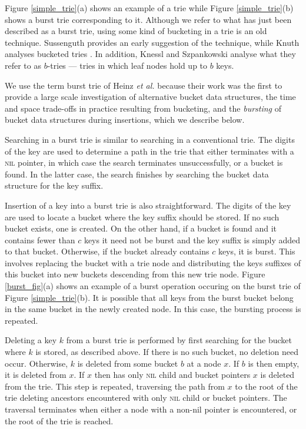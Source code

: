 \documentclass[]{acmtrans2m}
\begin{document}
Figure \ref{simple_trie}(a) shows an example of a trie while Figure \ref{simple_trie}(b)
shows a burst trie corresponding to it. Although we refer to what has just been described as a burst trie, using some kind of bucketing
in a trie is an old technique. Sussenguth \citeyear{Sussenguth63} provides an early suggestion of the technique, 
while Knuth analyses bucketed tries \citeyear{Knuth98}. In addition, Knessl and Szpankowski \citeyear{KnesslSzpankowski00a,KnesslSzpankowski00b} 
analyse what they refer to as $b$-tries --- tries in which leaf nodes hold up to $b$ keys. 

We use the term burst trie of Heinz \textit{et al.} \citeyear{Heinz+02} because their work was the first to
provide a large scale investigation of alternative bucket data structures, the time and space trade-offs
in practice resulting from bucketing, and the \textit{bursting} of bucket data structures during insertions,
which we describe below.

Searching in a burst trie is similar to searching in a conventional trie.
The digits of the key are used to determine a path in the trie that either terminates
with a \textsc{nil} pointer, in which case the search terminates unsuccessfully, or a bucket is found.
In the latter case, the search finishes by searching the bucket data structure for the key
suffix.

Insertion of a key into a burst trie is also straightforward. The digits of the key are used to locate
a bucket where the key suffix should be stored. If no such bucket exists, one is created. On the other
hand, if a bucket is found and it contains fewer than $c$ keys it need not be burst and the key suffix
is simply added to that bucket. Otherwise, if the bucket already contains $c$ keys, it is burst. This
involves replacing the bucket with a trie node and distributing the keys suffixes of this bucket into new buckets
descending from this new trie node. Figure \ref{burst_fig}(a) shows an example of a burst operation
occuring on the burst trie of Figure \ref{simple_trie}(b). It is possible that all keys from the
burst bucket belong in the same bucket in the newly created node. In this case, the bursting process is repeated.

Deleting a key $k$ from a burst trie is performed by first searching for the bucket where $k$ is stored, as described
above. If there is no such bucket, no deletion need occur. Otherwise, $k$ is deleted from some bucket $b$ at 
a node $x$. If $b$ is then empty, it is deleted from $x$. If $x$ then has only \textsc{nil} child and bucket pointers
$x$ is deleted from the trie. This step is repeated, traversing the path from $x$ to the root of the trie
deleting ancestors encountered with only \textsc{nil} child or bucket pointers. 
The traversal terminates when either a node with a non-nil pointer is encountered, or the root of the trie
is reached.
\end{document}
